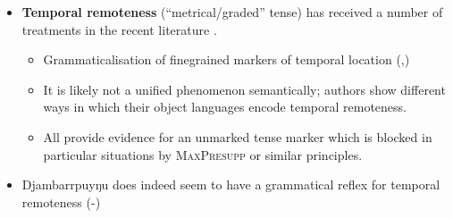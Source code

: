 \documentclass[11pt,dvipsnames]{article}
\begin{document}
\begin{minipage}{.65\textwidth}


\begin{itemize}
\item \textbf{Temporal remoteness} (``metrical/graded'' tense) has received a number of treatments in the recent literature \citep[e.g][]{Klecha2016,Cable2013,Bohnemeyer2018}.
\begin{itemize}
\item Grammaticalisation of finegrained markers of temporal location  (\citealp[84]{Comrie1983},\citealp{Dahl1983})
\item It is likely not a unified phenomenon semantically; authors show different ways in which their object languages encode temporal remoteness.
\item All provide evidence for an unmarked tense marker which is blocked in particular situations by \textsc{MaxPresupp} or similar principles.
\end{itemize}
\item Djambarrpuyŋu does indeed seem to have a grammatical reflex for temporal remoteness (-)

\end{itemize}
\end{minipage}
\end{document}
